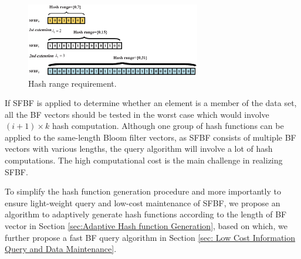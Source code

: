 \documentclass[10pt,journal,compsoc]{IEEEtran}
\begin{document}
\begin{figure}[!h]
\centering
\includegraphics[width=3.0in]{fig/HashRange}
\caption{Hash range requirement.}
\label{fig:Hash range requirement.}
\end{figure}

If SFBF is applied to determine whether an element  is  a member of the data set, all the BF vectors should be tested in the worst case which would involve $(i+1) \times k$ hash computation. Although one group of hash functions can be applied to the same-length Bloom filter vectors, as SFBF consists of multiple BF vectors with various lengths, the query algorithm will involve a lot of hash computations. The high computational cost is the main challenge in realizing SFBF.




To simplify the hash function generation procedure and more importantly to ensure light-weight query and low-cost maintenance of  SFBF, we propose an algorithm to adaptively generate hash functions according to the length of BF vector  in Section \ref{sec:Adaptive Hash function Generation}, based on which, we further propose a fast BF query algorithm in Section \ref{sec: Low Cost Information Query and Data Maintenance}.

\end{document}
